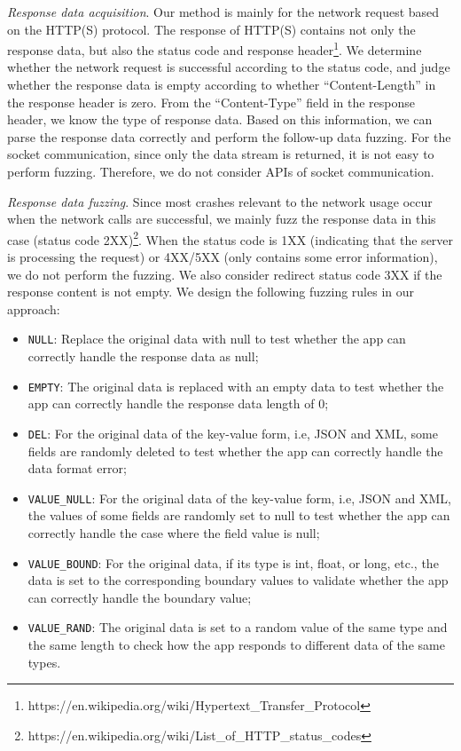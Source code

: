 \documentclass[sigconf,review, anonymous]{acmart}
\begin{document}
\textit{Response data acquisition}. Our method is mainly for the network request based on the HTTP(S) protocol. The response of HTTP(S) contains not only the response data, but also the status code and response header\footnote{https://en.wikipedia.org/wiki/Hypertext\_Transfer\_Protocol}. We determine whether the network request is successful according to the status code, and judge whether the response data is empty according to whether ``Content-Length'' in the response header is zero. From the ``Content-Type'' field in the response header, we know the type of response data. Based on this information, we can parse the response data correctly and perform the follow-up data fuzzing. For the socket communication, since only the data stream is returned, it is not easy to perform fuzzing. Therefore, we do not consider APIs of socket communication. 

\textit{Response data fuzzing}. Since most crashes relevant to the network usage occur when the network calls are successful, we mainly fuzz the response data in this case (status code 2XX)\footnote{https://en.wikipedia.org/wiki/List\_of\_HTTP\_status\_codes}. When the status code is 1XX (indicating that the server is processing the request) or  4XX/5XX (only contains some error information), we do not perform the fuzzing. We also consider redirect status code 3XX if the response content is not empty. We design the following fuzzing rules in our approach:

\begin{itemize}
\item \texttt{NULL}: Replace the original data with null to test whether the app can correctly handle the response data as null;
\item \texttt{EMPTY}: The original data is replaced with an empty data to test whether the app can correctly handle the response data length of 0;
\item \texttt{DEL}: For the original data of the key-value form, i.e, JSON and XML, some fields are randomly deleted to test whether the app can correctly handle the data format error;
\item \texttt{VALUE\_NULL}: For the original data of the key-value form, i.e, JSON and XML, the values of some fields are randomly set to null to test whether the app can correctly handle the case where the field value is null;
\item \texttt{VALUE\_BOUND}: For the original data, if its type is int, float, or long, etc., the data is set to the corresponding boundary values to validate whether the app can correctly handle the boundary value;
\item \texttt{VALUE\_RAND}: The original data is set to a random value of the same type and the same length to check how the app responds to different data of the same types.
\end{itemize}
\end{document}
